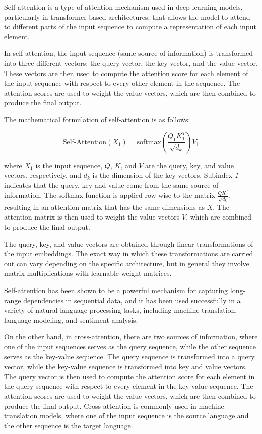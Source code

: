 Self-attention is a type of attention mechanism used in deep learning models, particularly in transformer-based architectures, that allows the model to attend to different parts of the input sequence to compute a representation of each input element.

In self-attention, the input sequence (same source of information) is transformed into three different vectors: the query vector, the key vector, and the value vector. These vectors are then used to compute the attention score for each element of the input sequence with respect to every other element in the sequence. The attention scores are used to weight the value vectors, which are then combined to produce the final output.

The mathematical formulation of self-attention is as follows:

\begin{equation}
	\text{Self-Attention}(X_{1}) = \text{softmax}\left(\frac{Q_{1}K_{1}^T}{\sqrt{d_k}}\right)V_{1}
\end{equation}

where $X_{1}$ is the input sequence, $Q$, $K$, and $V$ are the query, key, and value vectors, respectively, and $d_k$ is the dimension of the key vectors. Subindex \textit{1} indicates that the query, key and value come from the same source of information. The softmax function is applied row-wise to the matrix $\frac{QK^T}{\sqrt{d_k}}$, resulting in an attention matrix that has the same dimensions as $X$. The attention matrix is then used to weight the value vectors $V$, which are combined to produce the final output.

The query, key, and value vectors are obtained through linear transformations of the input embeddings. The exact way in which these transformations are carried out can vary depending on the specific architecture, but in general they involve matrix multiplications with learnable weight matrices.

Self-attention has been shown to be a powerful mechanism for capturing long-range dependencies in sequential data, and it has been used successfully in a variety of natural language processing tasks, including machine translation, language modeling, and sentiment analysis.

On the other hand, in cross-attention, there are two sources of information, where one of the input sequences serves as the query sequence, while the other sequence serves as the key-value sequence. The query sequence is transformed into a query vector, while the key-value sequence is transformed into key and value vectors. The query vector is then used to compute the attention score for each element in the query sequence with respect to every element in the key-value sequence. The attention scores are used to weight the value vectors, which are then combined to produce the final output. Cross-attention is commonly used in machine translation models, where one of the input sequence is the source language and the other sequence is the target language.

